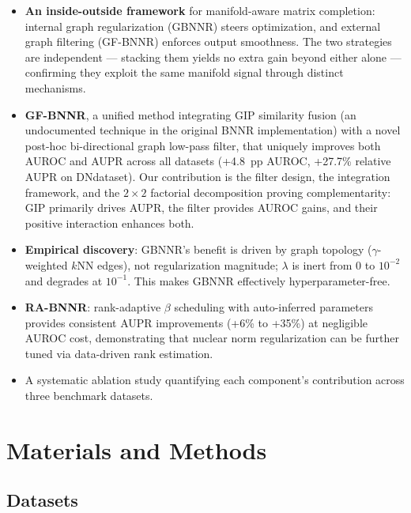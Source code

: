 \documentclass[unnumsec,webpdf,contemporary,large]{oup-authoring-template}
\begin{document}
\begin{itemize}
\item \textbf{An inside-outside framework} for manifold-aware matrix completion: internal graph regularization (GBNNR) steers optimization, and external graph filtering (GF-BNNR) enforces output smoothness. The two strategies are independent --- stacking them yields no extra gain beyond either alone --- confirming they exploit the same manifold signal through distinct mechanisms.

\item \textbf{GF-BNNR}, a unified method integrating GIP similarity fusion (an undocumented technique in the original BNNR implementation) with a novel post-hoc bi-directional graph low-pass filter, that uniquely improves both AUROC and AUPR across all datasets (+4.8~pp AUROC, +27.7\% relative AUPR on DNdataset). Our contribution is the filter design, the integration framework, and the $2\times2$ factorial decomposition proving complementarity: GIP primarily drives AUPR, the filter provides AUROC gains, and their positive interaction enhances both.

\item \textbf{Empirical discovery}: GBNNR's benefit is driven by graph topology ($\gamma$-weighted $k$NN edges), not regularization magnitude; $\lambda$ is inert from $0$ to $10^{-2}$ and degrades at $10^{-1}$. This makes GBNNR effectively hyperparameter-free.

\item \textbf{RA-BNNR}: rank-adaptive $\beta$ scheduling with auto-inferred parameters provides consistent AUPR improvements (+6\% to +35\%) at negligible AUROC cost, demonstrating that nuclear norm regularization can be further tuned via data-driven rank estimation.

\item A systematic ablation study quantifying each component's contribution across three benchmark datasets.
\end{itemize}

\section{Materials and Methods}
\label{sec:materials_methods}

\subsection{Datasets}
\label{sec:datasets}
\end{document}
